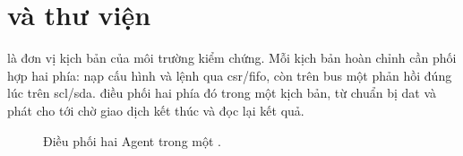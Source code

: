 \section{\VirtualSequencer{} và thư viện \VirtualSequence{}}
\label{sec:ver-vseq}

\VirtualSequence{} là đơn vị kịch bản của môi trường kiểm chứng. Mỗi kịch bản hoàn chỉnh cần
phối hợp hai phía: \Host{} nạp cấu hình và lệnh qua \gls{csr}/\gls{fifo}, còn trên bus một \Target{} phản
hồi đúng lúc trên \gls{scl}/\gls{sda}. \VirtualSequence{} điều phối hai phía đó trong một kịch bản, từ
chuẩn bị \gls{dat} và phát \CommandDescriptor{} cho tới chờ giao dịch kết thúc và đọc lại kết quả.

\begin{figure}[!htbp]
	\centering
	\resizebox{\textwidth}{!}{}
	\caption{Điều phối hai Agent trong một \VirtualSequence{}.}
	\label{fig:vseq-fork}
\end{figure}

